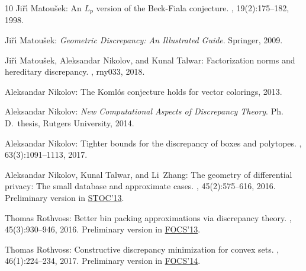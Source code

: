 \documentclass[11pt]{article}
\numberwithin{equation}{section}
\theoremstyle{definition}
\theoremstyle{plain}
\begin{document}
\begin{thebibliography}{10}
{\sc Ji{\v{r}}{\'\i} Matou{\v{s}}ek}: An {$L_p$} version of the {B}eck-{F}iala
  conjecture.
, 19(2):175--182, 1998.

{\sc Ji{\v{r}}{\'\i} Matou\v{s}ek}: {\em Geometric Discrepancy: {A}n
  Illustrated Guide}.
\newblock Springer, 2009.
\newblock [\epfmtdoi{10.1007/978-3-642-03942-3}]

{\sc Ji{\v{r}}{\'\i} Matou\v{s}ek, Aleksandar Nikolov, and Kunal Talwar}:
  Factorization norms and hereditary discrepancy.
, rny033, 2018.

{\sc Aleksandar Nikolov}: The {K}oml\'{o}s conjecture holds for vector
  colorings, 2013.

{\sc Aleksandar Nikolov}: {\em New Computational Aspects of Discrepancy
  Theory}.
\newblock Ph.\,D.\ thesis, Rutgers University, 2014.
\newblock [\epfmtdoi{10.7282/T3RN3749}]

{\sc Aleksandar Nikolov}: Tighter bounds for the discrepancy of boxes and
  polytopes.
, 63(3):1091--1113, 2017.

{\sc Aleksandar Nikolov, Kunal Talwar, and Li~Zhang}: The geometry of
  differential privacy: {T}he small database and approximate cases.
, 45(2):575--616, 2016.
\newblock Preliminary version in
  \href{https://doi.org/10.1145/2488608.2488652}{STOC'13}.

{\sc Thomas Rothvoss}: Better bin packing approximations via discrepancy
  theory.
, 45(3):930--946, 2016.
\newblock Preliminary version in
  \href{https://doi.org/10.1109/FOCS.2013.11}{FOCS'13}.

{\sc Thomas Rothvoss}: Constructive discrepancy minimization for convex sets.
, 46(1):224--234, 2017.
\newblock Preliminary version in
  \href{https://doi.org/10.1109/FOCS.2014.23}{FOCS'14}.


\end{thebibliography}
\end{document}
